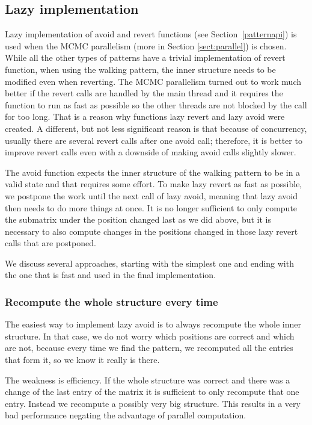 \subsection{Lazy implementation}
Lazy implementation of avoid and revert functions (see Section~\ref{patternapi}) is used when the MCMC parallelism (more in Section \ref{sect:parallel}) is chosen. While all the other types of patterns have a trivial implementation of revert function, when using the walking pattern, the inner structure needs to be modified even when reverting. The MCMC parallelism turned out to work much better if the revert calls are handled by the main thread and it requires the function to run as fast as possible so the other threads are not blocked by the call for too long. That is a reason why functions lazy revert and lazy avoid were created. A different, but not less significant reason is that because of concurrency, usually there are several revert calls after one avoid call; therefore, it is better to improve revert calls even with a downside of making avoid calls slightly slower.

The avoid function expects the inner structure of the walking pattern to be in a valid state and that requires some effort. To make lazy revert as fast as possible, we postpone the work until the next call of lazy avoid, meaning that lazy avoid then needs to do more things at once. It is no longer sufficient to only compute the submatrix under the position changed last as we did above, but it is necessary to also compute changes in the positions changed in those lazy revert calls that are postponed.

We discuss several approaches, starting with the simplest one and ending with the one that is fast and used in the final implementation.

\subsubsection{Recompute the whole structure every time}
The easiest way to implement lazy avoid is to always recompute the whole inner structure. In that case, we do not worry which positions are correct and which are not, because every time we find the pattern, we recomputed all the entries that form it, so we know it really is there.

The weakness is efficiency. If the whole structure was correct and there was a change of the last entry of the matrix it is sufficient to only recompute that one entry. Instead we recompute a possibly very big structure. This results in a very bad performance negating the advantage of parallel computation.
